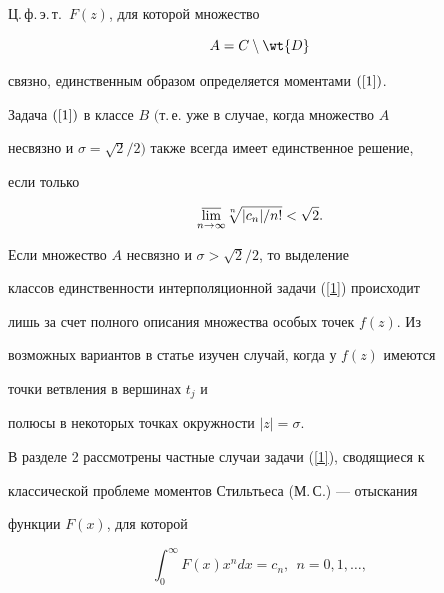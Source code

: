 \begin{thm}


Ц.\,ф.\,э.\,т.\ $F(z)$, для которой множество 


\begin{equation}\label{6}


A=C\setminus\wt{D}


\end{equation}


связно, единственным образом определяется моментами $(\ref{1})$.





Задача $(\ref{1})$ в классе $B$ $($т.\,е. уже в случае, когда множество $A$


несвязно и $\sigma=\sqrt2/2)$ также всегда имеет единственное решение,


если только


\begin{equation}\label{7}


\underset{n\to\infty}{\varlimsup}{}\sqrt[\uproot{2}n]{|c_n|/n!}<\sqrt2.


\end{equation}


\end{thm}





Если множество $A$ несвязно и $\sigma>\sqrt2/2$, то выделение


классов единственности интерполяционной задачи (\ref{1}) происходит


лишь за счет полного описания множества особых точек $f(z)$. Из


возможных вариантов в статье изучен случай, когда у $f(z)$ имеются


точки ветвления в вершинах $t_j$ и


полюсы в некоторых точках окружности $|z|=\sigma$.





В разделе 2 рассмотрены частные случаи задачи (\ref{1}), сводящиеся к 


классической проблеме моментов Стильтьеса (М.\,С.) --- отыскания 


функции $F(x)$, для которой


\begin{equation}\label{8}


\int_0^\infty F(x)x^n dx=c_n,\ \ n=0,1,\dotsc,


\end{equation}


